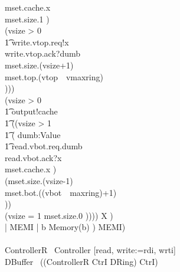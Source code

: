 \documentclass[10pt]{article}
\begin{document}
\begin{circus}
                                 mset.cache.x \then \\
                                 mset.size.1 \then \Skip)
                             \\
                             \extchoice 
                             (\lcircguard vsize > 0 \rcircguard \circguard \\
                             \t1
                                 write.vtop.req!x \then \\
                                 write.vtop.ack?dumb \then \\
                                 mset.size.(vsize+1) \then \\
                                 mset.top.(vtop~\mod~vmaxring) \then \\
                                 \Skip))) \\
                \extchoice
                (\lcircguard vsize > 0 \rcircguard \circguard \\
                    \t1
                        output!cache \then \\
                        \t1
                            ((\lcircguard vsize > 1 \rcircguard \circguard \\
                            \t1 (
                            \Intchoice dumb:Value \circspot \\
                            \t1
                            read.vbot.req.dumb \then \\
                            read.vbot.ack?x \then \\
                            mset.cache.x \then \Skip
                            )\circseq\ \\
                            (mset.size.(vsize-1) \then \\
                                    mset.bot.((vbot~\mod~maxring)+1) \then \\
                                    \Skip))
                        \\
                        \extchoice (\lcircguard vsize = 1 \rcircguard 
                                    \circguard mset.size.0 \then \Skip))))
                \circseq X
            ) \\
            \lpar {} | MEMI | { b } \rpar Memory(b)
        ) \circhide MEMI)
    \\
    \circend
    \\
    \circprocess ControllerR \circdef\ Controller [read, write:=rdi, wrti]
    \\
    \circprocess DBuffer \circdef\ ((ControllerR \lpar CtrI \rpar DRing) \circhide CtrI)
\end{circus}%
\end{document}
